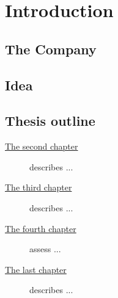 \chapter{Introduction}
\label{cap:introduction}

\section{The Company}



\section{Idea}



\section{Thesis outline}

\begin{description}
    \item[{\hyperref[cap:requirements]{The second chapter}}] describes ...
    \item[{\hyperref[cap:method]{The third chapter}}] describes ...
    \item[{\hyperref[cap:results]{The fourth chapter}}] assess ...
    \item[{\hyperref[cap:conclusion]{The last chapter}}] describes ...
\end{description}
